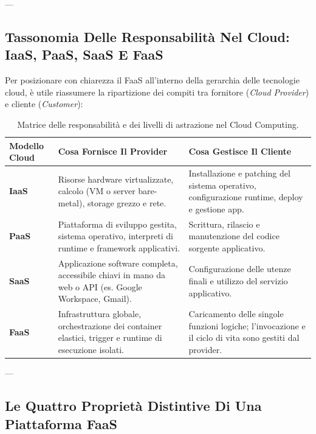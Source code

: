 \documentclass[11pt, a4paper]{article}
\begin{document}
---

\subsection{Tassonomia Delle Responsabilità Nel Cloud: IaaS, PaaS, SaaS E FaaS}

Per posizionare con chiarezza il FaaS all'interno della gerarchia delle tecnologie cloud, è utile riassumere la ripartizione dei compiti tra fornitore (\emph{Cloud Provider}) e cliente (\emph{Customer}):

\begin{table}[H]
\centering
\small
\renewcommand{\arraystretch}{1.3}
\begin{tabularx}{\textwidth}{p{2cm} X X}
\toprule
\textbf{Modello Cloud} & \textbf{Cosa Fornisce Il Provider} & \textbf{Cosa Gestisce Il Cliente} \\
\midrule
\textbf{IaaS} & Risorse hardware virtualizzate, calcolo (VM o server bare-metal), storage grezzo e rete. & Installazione e patching del sistema operativo, configurazione runtime, deploy e gestione app. \\
\textbf{PaaS} & Piattaforma di sviluppo gestita, sistema operativo, interpreti di runtime e framework applicativi. & Scrittura, rilascio e manutenzione del codice sorgente applicativo. \\
\textbf{SaaS} & Applicazione software completa, accessibile chiavi in mano da web o API (es. Google Workspace, Gmail). & Configurazione delle utenze finali e utilizzo del servizio applicativo. \\
\textbf{FaaS} & Infrastruttura globale, orchestrazione dei container elastici, trigger e runtime di esecuzione isolati. & Caricamento delle singole funzioni logiche; l'invocazione e il ciclo di vita sono gestiti dal provider. \\
\bottomrule
\end{tabularx}
\caption{Matrice delle responsabilità e dei livelli di astrazione nel Cloud Computing.}
\label{tab:cloud_models}
\end{table}

---

\subsection{Le Quattro Proprietà Distintive Di Una Piattaforma FaaS}
\end{document}
